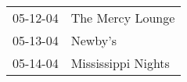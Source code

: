 \begin{supertabular}{p{0.07\textwidth}p{0.23\textwidth}}
 05-12-04 &    The Mercy Lounge \\
 05-13-04 &             Newby's \\
 05-14-04 &  Mississippi Nights \\
\end{supertabular}
